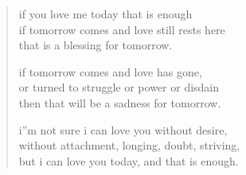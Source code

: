 
\begin{verse}
if you love me today that is enough \\
if tomorrow comes and love still rests here \\
that is a blessing for tomorrow.

if tomorrow comes and love has gone, \\
or turned to struggle or power or disdain \\
then that will be a sadness for tomorrow.

i''m not sure i can love you without desire, \\
without attachment, longing, doubt, striving, \\
but i can love you today, and that is enough.
\end{verse}
